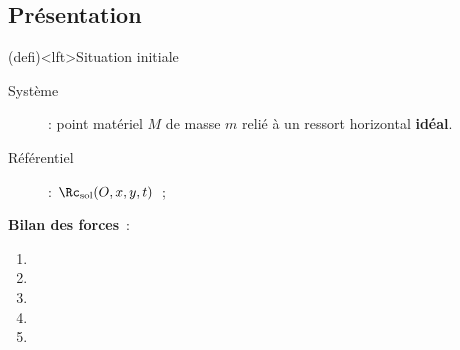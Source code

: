 \documentclass[../../main/main.tex]{subfiles}
\begin{document}
\subsection{Présentation}
\begin{tcb}(defi)<lft>{Situation initiale}
	\begin{description}
		\item[Système] : point matériel $M$ de masse $m$ relié à un ressort
		      horizontal \textbf{idéal}.
		\item[Référentiel] : $\Rc_{\rm sol} (O,x,y,t)$~;
	\end{description}
	\bigbreak
	\begin{minipage}{0.55\linewidth}
		\textbf{Bilan des forces}~:
		\begin{enumerate}
			\item
			\item
			\item
			\item
			\item
		\end{enumerate}
	\end{minipage}
	\begin{minipage}{0.45\linewidth}
		\begin{center}
			\vspace{-15pt}
		\end{center}
	\end{minipage}

\end{tcb}
\end{document}

